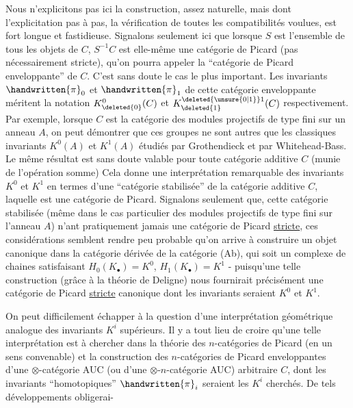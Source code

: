 Nous n'explicitons pas ici la construction, assez naturelle, mais dont l'explicitation pas à pas,  la vérification de toutes les compatibilités voulues, est fort longue et fastidieuse. Signalons seulement ici que lorsque $S$ est l'ensemble de tous les objets de $C$, $S^{-1}C$ est elle-même une catégorie de Picard (pas nécessairement stricte), qu'on pourra appeler la ``catégorie de Picard enveloppante'' de $C$. C'est sans doute le cas le plus important. Les invariants $\handwritten{\pi}_{0}$ et $\handwritten{\pi}_{1}$ de cette catégorie enveloppante méritent la notation $K^{0}_{\deleted{0}}(C)$ et $K^{\deleted{\unsure{0|1}}1}_{\deleted{1}}(C)$ respectivement. Par exemple, lorsque $C$ est la catégorie des modules projectifs de type fini sur un anneau $A$,  on peut démontrer que ces groupes ne sont autres que les classiques invariants $K^{0}(A)$ et $K^{1}(A)$ étudiés par Grothendieck et par Whitehead-Bass. Le même résultat est sans doute valable pour toute catégorie additive $C$ (munie de  l'opération somme) Cela donne une interprétation remarquable des invariants $K^{0}$ et $K^{1}$ en termes d'une ``catégorie stabilisée'' \handwritten{(}de la catégorie additive $C$\handwritten{)}, laquelle est une catégorie de Picard. Signalons seulement que, cette catégorie stabilisée (même dans le cas particulier des modules projectifs de type fini sur l'anneau $A$) n'ant pratiquement jamais une catégorie de Picard \uline{stricte}, ces considérations semblent rendre peu probable qu'on arrive à construire un objet canonique dans la catégorie dérivée de la catégorie (Ab), qui soit un complexe de chaines satisfaisant $H_{0}(K_{\bullet})=K^{0}$, $H_{1}(K_{\bullet})=K^{1}$ - puisqu'une telle construction (grâce à la théorie de Deligne) nous fournirait précisément une catégorie de Picard \uline{stricte} canonique dont les invariants seraient $K^{0}$ et $K^{1}$.

On peut difficilement échapper à la question d'une interprétation géométrique analogue des invariants $K^{i}$ supérieurs. Il y a tout lieu de croire qu'une telle interprétation est à chercher dans la théorie des $n$-catégories de Picard (en un sens convenable) et la construction des $n$-catégories de Picard enveloppantes d'une $\otimes$-catégorie AUC (ou d'une $\otimes$-$n$-catégorie AUC) arbitraire $C$, dont les invariants ``homotopiques'' $\handwritten{\pi}_{i}$ seraient les $K^{i}$ cherchés. De tels développements obligerai-

